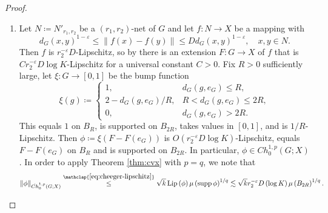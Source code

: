\documentclass[11pt,reqno]{amsart}
\newcommand{\1}{\mathbf 1}
\begin{document}
\begin{proof}\,
\begin{enumerate}
\item
Let $N\coloneqq N'_{r_1,r_2}$ be a $\left(r_1,r_2\right)$-net of $G$ and let $f:N\to X$ be a mapping with
\[
d_G\left(x,y\right)^{1-\varepsilon}\le \left\|f\left(x\right)-f\left(y\right)\right\|\le D d_G\left(x,y\right)^{1-\varepsilon},\quad x,y\in N.
\]
Then $f$ is $r_2^{-\varepsilon}D$-Lipschitz, so by \cite[Theorem 1.6]{lee2005extending} there is an extension $F:G\to X$ of $f$ that is $Cr_2^{-\varepsilon}D\log K$-Lipschitz for a universal constant $C>0$. Fix $R>0$ sufficiently large, let $\xi:G\to [0,1]$ be the bump function
\[
\xi\left(g\right)\coloneqq
\begin{cases}
    1,&d_G\left(g,e_G\right)\le R,\\
    2-d_G\left(g,e_G\right)/R,& R<d_G\left(g,e_G\right)\le 2R,\\
    0,&d_G\left(g,e_G\right)>2R.
\end{cases}
\]
This equals $1$ on $B_R$, is supported on $B_{2R}$, takes values in $\left[0,1\right]$, and is $1/R$-Lipschitz. Then $\phi\coloneqq \xi \left(F-F\left(e_G\right)\right)$ is $O\left(r_2^{-\varepsilon}D\log K\right)$-Lipschitz, equals $F-F\left(e_G\right)$ on $B_R$ and is supported on $B_{2R}$. In particular, $\phi\in Ch_0^{1,p}\left(G;X\right)$. In order to apply Theorem \ref{thm:cvx} with $p=q$, we note that
\begin{equation}\label{eq:phi-cheeger-ub}
    \left\|\phi\right\|_{\dot{Ch}_0^{1,p}\left(G;X\right)}\stackrel{\mathclap{\eqref{eq:cheeger-lipschitz}}}{\le} \sqrt{k}\operatorname{Lip}\left(\phi\right)\mu\left(\operatorname{supp}\phi\right)^{1/q}\lesssim \sqrt{k}r_2^{-\varepsilon}D\left(\log K\right) \mu\left(B_{2R}\right)^{1/q}.
\end{equation}


\end{enumerate}
\end{proof}
\end{document}
